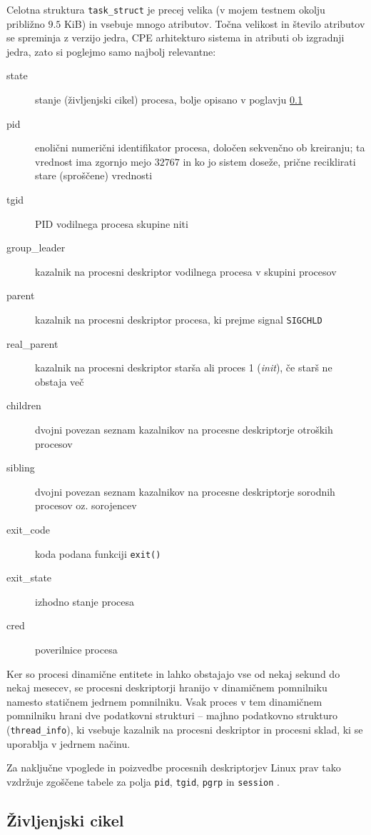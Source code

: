 \documentclass[a4paper,12pt,openright]{book}
\begin{document}
Celotna struktura \texttt{task\_struct} je precej velika (v mojem testnem okolju približno $9.5$ KiB) in vsebuje mnogo atributov.
Točna velikost in število atributov se spreminja z verzijo jedra, CPE arhitekturo sistema in atributi ob izgradnji jedra, zato si poglejmo samo najbolj relevantne:
\begin{description}
	\item[state] stanje (življenjski cikel) procesa, bolje opisano v poglavju \ref{ssec:linux_process:lifecycle}
	\item[pid] enolični numerični identifikator procesa, določen sekvenčno ob kreiranju; ta vrednost ima zgornjo mejo $32767$ in ko jo sistem doseže, prične reciklirati stare (sproščene) vrednosti
	\item[tgid] PID vodilnega procesa skupine niti
	\item[group\_leader] kazalnik na procesni deskriptor vodilnega procesa v skupini procesov
	\item[parent] kazalnik na procesni deskriptor procesa, ki prejme signal \texttt{SIGCHLD}
	\item[real\_parent] kazalnik na procesni deskriptor starša ali proces 1 (\textit{init}), če starš ne obstaja več
	\item[children] dvojni povezan seznam kazalnikov na procesne deskriptorje otroških procesov
	\item[sibling] dvojni povezan seznam kazalnikov na procesne deskriptorje sorodnih procesov oz. sorojencev
	\item[exit\_code] koda podana funkciji \texttt{exit()}
	\item[exit\_state] izhodno stanje procesa 
	\item[cred] poverilnice procesa
\end{description}

Ker so procesi dinamične entitete in lahko obstajajo vse od nekaj sekund do nekaj mesecev, se procesni deskriptorji hranijo v dinamičnem pomnilniku namesto statičnem jedrnem pomnilniku.
Vsak proces v tem dinamičnem pomnilniku hrani dve podatkovni strukturi -- majhno podatkovno strukturo (\texttt{thread\_info}), ki vsebuje kazalnik na procesni deskriptor in procesni sklad, ki se uporablja v jedrnem načinu.

Za naključne vpoglede in poizvedbe procesnih deskriptorjev Linux prav tako vzdržuje zgoščene tabele za polja \texttt{pid}, \texttt{tgid}, \texttt{pgrp} in \texttt{session} \cite{Bovet_Cesati_2005}.

\subsection{Življenjski cikel} \label{ssec:linux_process:lifecycle} %
\end{document}
